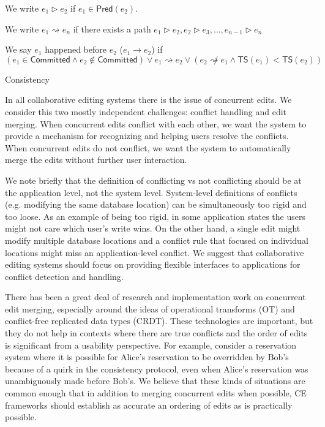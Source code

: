 \documentclass{article}
\begin{document}
We write $e_1{\rhd}e_2$ if $e_1 \in \mathsf{Pred}(e_2)$.

We write $e_1{\rightsquigarrow}e_n$ if there exists a path $e_1{\rhd}e_2, e_2{\rhd}e_3, \ldots, e_{n-1}{\rhd}e_n$

We say $e_1$ happened before $e_2$ ($e_1{\rightarrow}e_2$) if $(e_1 \in \mathsf{Committed} \land e_2 \not\in \mathsf{Committed}) \lor e_1{\rightsquigarrow}e_2 \lor (e_2{\not\rightsquigarrow}e_1 \land \mathsf{TS}(e_1)<\mathsf{TS}(e_2))$










Consistency

In all collaborative editing systems there is the issue of concurrent edits.
We consider this two mostly independent challenges: conflict handling and edit merging.
When concurrent edits conflict with each other, we want the system to provide a mechanism for recognizing and helping users resolve the conflicts.
When concurrent edits do not conflict, we want the system to automatically merge the edits without further user interaction.

We note briefly that the definition of conflicting vs not conflicting should be at the application level, not the system level.
System-level definitions of conflicts (e.g. modifying the same database location) can be simultaneously too rigid and too loose.
As an example of being too rigid, in some application states the users might not care which user's write wins.
On the other hand, a single edit might modify multiple database locations and a conflict rule that focused on individual locations might miss an application-level conflict.
We suggest that collaborative editing systems should focus on providing flexible interfaces to applications for conflict detection and handling.

There has been a great deal of research and implementation work on concurrent edit merging, especially around the ideas of operational transforms (OT) and conflict-free replicated data types (CRDT).
These technologies are important, but they do not help in contexts where there are true conflicts and the order of edits is significant from a usability perspective.
For example, consider a reservation system where it is possible for Alice's reservation to be overridden by Bob's because of a quirk in the consistency protocol, even when Alice's reservation was unambiguously made before Bob's.
We believe that these kinds of situations are common enough that in addition to merging concurrent edits when possible, CE frameworks should establish as accurate an ordering of edits as is practically possible.
\end{document}
